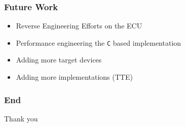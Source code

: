 \documentclass{beamer}
\begin{document}
\begin{frame}
  \frametitle{Future Work}

  \begin{itemize}
    \item Reverse Engineering Efforts on the ECU
    \item Performance engineering the \texttt{C} based implementation
    \item Adding more target devices
    \item Adding more implementations (TTE)
  \end{itemize}

\end{frame}


\begin{frame}
  \frametitle{End}

  \centerline{{\Large Thank you}}

\end{frame}
\end{document}
